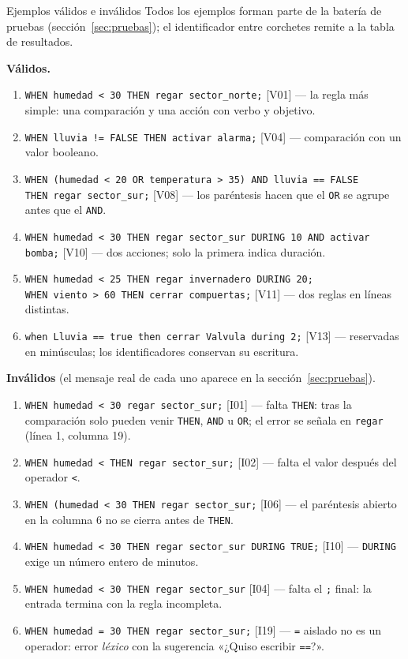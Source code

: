 \documentclass[11pt,letterpaper]{article}
\makeatletter
\renewcommand\subsection{\@startsection{subsection}{2}{\z@}{-2.6ex\@plus -1ex \@minus -.2ex}{1.0ex \@plus .2ex}%
  {\normalfont\large\bfseries}}
\newcommand{\T}[1]{\texttt{#1}}
\makeatother
\begin{document}
\subsection{Ejemplos válidos e inválidos}\label{sec:ejemplos}
Todos los ejemplos forman parte de la batería de pruebas (sección~\ref{sec:pruebas}); el identificador entre
corchetes remite a la tabla de resultados.

\textbf{Válidos.}
\begin{enumerate}
\item \T{WHEN humedad < 30 THEN regar sector\_norte;} [V01] --- la regla más simple: una comparación y una acción
con verbo y objetivo.
\item \T{WHEN lluvia != FALSE THEN activar alarma;} [V04] --- comparación con un valor booleano.
\item \T{WHEN (humedad < 20 OR temperatura > 35) AND lluvia == FALSE}\\ \T{THEN regar sector\_sur;} [V08] --- los
paréntesis hacen que el \T{OR} se agrupe antes que el \T{AND}.
\item \T{WHEN humedad < 30 THEN regar sector\_sur DURING 10 AND activar bomba;} [V10] --- dos acciones; solo la
primera indica duración.
\item \T{WHEN humedad < 25 THEN regar invernadero DURING 20;}\\
\T{WHEN viento > 60 THEN cerrar compuertas;} [V11] --- dos reglas en líneas distintas.
\item \T{when Lluvia == true then cerrar Valvula during 2;} [V13] --- reservadas en minúsculas; los
identificadores conservan su escritura.
\end{enumerate}

\textbf{Inválidos} (el mensaje real de cada uno aparece en la sección~\ref{sec:pruebas}).
\begin{enumerate}
\item \T{WHEN humedad < 30 regar sector\_sur;} [I01] --- falta \T{THEN}: tras la comparación solo pueden venir
\T{THEN}, \T{AND} u \T{OR}; el error se señala en \T{regar} (línea 1, columna 19).
\item \T{WHEN humedad < THEN regar sector\_sur;} [I02] --- falta el valor después del operador \T{<}.
\item \T{WHEN (humedad < 30 THEN regar sector\_sur;} [I06] --- el paréntesis abierto en la columna 6 no se cierra
antes de \T{THEN}.
\item \T{WHEN humedad < 30 THEN regar sector\_sur DURING TRUE;} [I10] --- \T{DURING} exige un número entero de
minutos.
\item \T{WHEN humedad < 30 THEN regar sector\_sur} [I04] --- falta el \T{;} final: la entrada termina con la regla
incompleta.
\item \T{WHEN humedad = 30 THEN regar sector\_sur;} [I19] --- \T{=} aislado no es un operador: error
\emph{léxico} con la sugerencia «¿Quiso escribir \T{==}?».
\end{enumerate}
\end{document}
